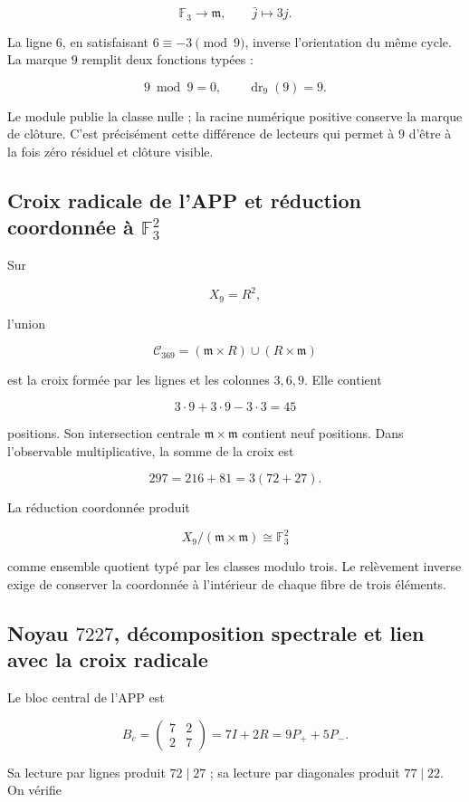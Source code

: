 \[
\mathbb F_3\longrightarrow\mathfrak m,
\qquad
\bar j\longmapsto3j.
\]

La ligne \(6\), en satisfaisant \(6\equiv-3\pmod9\), inverse l’orientation du même cycle. La marque \(9\) remplit deux fonctions typées :

\[
9\bmod9=0,
\qquad
\operatorname{dr}_9(9)=9.
\]

Le module publie la classe nulle ; la racine numérique positive conserve la marque de clôture. C’est précisément cette différence de lecteurs qui permet à \(9\) d’être à la fois zéro résiduel et clôture visible.

\subsection{Croix radicale de l’APP et réduction coordonnée à \(\mathbb F_3^2\)}

Sur

\[
X_9=R^2,
\]

l’union

\[
\mathscr C_{369}
=(\mathfrak m\times R)\cup(R\times\mathfrak m)
\]

est la croix formée par les lignes et les colonnes \(3,6,9\). Elle contient

\[
3\cdot9+3\cdot9-3\cdot3=45
\]

positions. Son intersection centrale \(\mathfrak m\times\mathfrak m\) contient neuf positions. Dans l’observable multiplicative, la somme de la croix est

\[
297=216+81=3(72+27).
\]

La réduction coordonnée produit

\[
X_9/(\mathfrak m\times\mathfrak m)\cong\mathbb F_3^2
\]

comme ensemble quotient typé par les classes modulo trois. Le relèvement inverse exige de conserver la coordonnée à l’intérieur de chaque fibre de trois éléments.

\subsection{Noyau \(7227\), décomposition spectrale et lien avec la croix radicale}

Le bloc central de l’APP est

\[
B_c=
\begin{pmatrix}
7&2\\
2&7
\end{pmatrix}
=7I+2R
=9P_++5P_-.
\]

Sa lecture par lignes produit \(72\mid27\) ; sa lecture par diagonales produit \(77\mid22\). On vérifie

